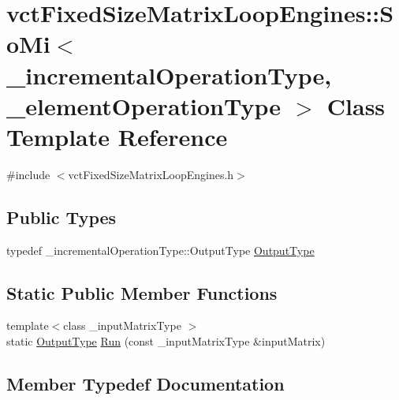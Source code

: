 \hypertarget{classvct_fixed_size_matrix_loop_engines_1_1_so_mi}{}\section{vct\+Fixed\+Size\+Matrix\+Loop\+Engines\+:\+:So\+Mi$<$ \+\_\+incremental\+Operation\+Type, \+\_\+element\+Operation\+Type $>$ Class Template Reference}
\label{classvct_fixed_size_matrix_loop_engines_1_1_so_mi}


{\ttfamily \#include $<$vct\+Fixed\+Size\+Matrix\+Loop\+Engines.\+h$>$}

\subsection*{Public Types}
\begin{DoxyCompactItemize}
\item 
typedef \+\_\+incremental\+Operation\+Type\+::\+Output\+Type \hyperlink{classvct_fixed_size_matrix_loop_engines_1_1_so_mi_a8b6dbfea0d78d203a24342c80c62d6f9}{Output\+Type}
\end{DoxyCompactItemize}
\subsection*{Static Public Member Functions}
\begin{DoxyCompactItemize}
\item 
{\footnotesize template$<$class \+\_\+input\+Matrix\+Type $>$ }\\static \hyperlink{classvct_fixed_size_matrix_loop_engines_1_1_so_mi_a8b6dbfea0d78d203a24342c80c62d6f9}{Output\+Type} \hyperlink{classvct_fixed_size_matrix_loop_engines_1_1_so_mi_aaf984e73075c76f63efba0b37ec2c6f9}{Run} (const \+\_\+input\+Matrix\+Type \&input\+Matrix)
\end{DoxyCompactItemize}


\subsection{Member Typedef Documentation}
\hypertarget{classvct_fixed_size_matrix_loop_engines_1_1_so_mi_a8b6dbfea0d78d203a24342c80c62d6f9}{}
